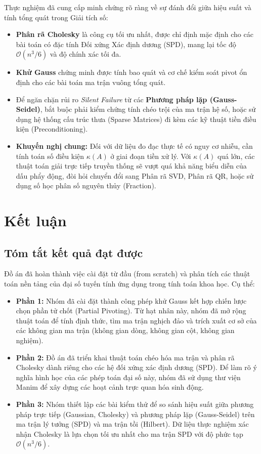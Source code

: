 \documentclass[12pt,a4paper]{article}
\begin{document}
\begin{infobox}
    Thực nghiệm đã cung cấp minh chứng rõ ràng về sự đánh đổi giữa hiệu suất và tính tổng quát trong Giải tích số:
    \begin{itemize}
        \item \textbf{Phân rã Cholesky} là công cụ tối ưu nhất, được chỉ định mặc định cho các bài toán có đặc tính Đối xứng Xác định dương (SPD), mang lại tốc độ $\mathcal{O}(n^3/6)$ và độ chính xác tối đa.
        \item \textbf{Khử Gauss} chứng minh được tính bao quát và cơ chế kiểm soát pivot ổn định cho các bài toán ma trận vuông tổng quát.
        \item Để ngăn chặn rủi ro \textit{Silent Failure} từ các \textbf{Phương pháp lặp (Gauss-Seidel)}, bắt buộc phải kiểm chứng tính chéo trội của ma trận hệ số, hoặc sử dụng hệ thống cấu trúc thưa (Sparse Matrices) đi kèm các kỹ thuật tiền điều kiện (Preconditioning).
        \item \textbf{Khuyến nghị chung:} Đối với dữ liệu đo đạc thực tế có nguy cơ nhiễu, cần tính toán số điều kiện $\kappa(A)$ ở giai đoạn tiền xử lý. Với $\kappa(A)$ quá lớn, các thuật toán giải trực tiếp truyền thống sẽ vượt quá khả năng biểu diễn của dấu phẩy động, đòi hỏi chuyển đổi sang Phân rã SVD, Phân rã QR, hoặc sử dụng số học phân số nguyên thủy (Fraction).
    \end{itemize}
\end{infobox}

\section{Kết luận}

\subsection{Tóm tắt kết quả đạt được}
Đồ án đã hoàn thành việc cài đặt từ đầu (from scratch) và phân tích các thuật toán nền tảng của đại số tuyến tính ứng dụng trong tính toán khoa học. Cụ thể:
\begin{itemize}
    \item \textbf{Phần 1:} Nhóm đã cài đặt thành công phép khử Gauss kết hợp chiến lược chọn phần tử chốt (Partial Pivoting). Từ hạt nhân này, nhóm đã mở rộng thuật toán để tính định thức, tìm ma trận nghịch đảo và trích xuất cơ sở của các không gian ma trận (không gian dòng, không gian cột, không gian nghiệm).
    \item \textbf{Phần 2:} Đồ án đã triển khai thuật toán chéo hóa ma trận và phân rã Cholesky dành riêng cho các hệ đối xứng xác định dương (SPD). Để làm rõ ý nghĩa hình học của các phép toán đại số này, nhóm đã sử dụng thư viện Manim để xây dựng các hoạt cảnh trực quan hóa sinh động.
    \item \textbf{Phần 3:} Nhóm thiết lập các bài kiểm thử để so sánh hiệu suất giữa phương pháp trực tiếp (Gaussian, Cholesky) và phương pháp lặp (Gauss-Seidel) trên ma trận lý tưởng (SPD) và ma trận tồi (Hilbert). Dữ liệu thực nghiệm xác nhận Cholesky là lựa chọn tối ưu nhất cho ma trận SPD với độ phức tạp $\mathcal{O}(n^3/6)$.
\end{itemize}
\end{document}
